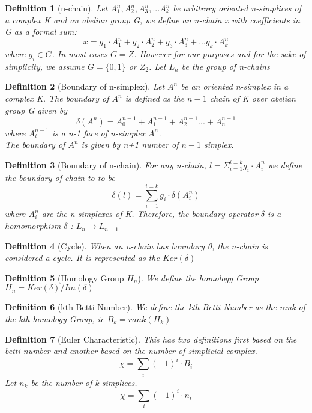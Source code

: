 \documentclass{article}
\newtheorem{definition}{Definition}
\begin{document}
\begin{definition}[n-chain] \label{def:n-chain}
    Let $A_1^n, A_2^n, A_3^n, ... A_k^n$ be arbitrary oriented n-simplices of a complex K and an abelian group G, we define an n-chain x with coefficients in G as a formal sum:
    $$x = g_1 \cdot A_1^n + g_2 \cdot A_2^ n + g_3 \cdot A_3^ n + ... g_k \cdot A_k^ n $$
    where $g_i \in G$.
    In most cases $G = Z$. However for our purposes and for the sake of simplicity, we assume $G = \{0, 1\}$ or $Z_2$. Let $L_n$ be the group of n-chains
\end{definition}

\begin{definition}[Boundary of n-simplex] \label{def:Boundary of n-simplex}
    Let $A^n$ be an oriented n-simplex in a complex K. The boundary of $A^n$ is defined as the $n - 1$ chain of K over abelian group G given by 
    $$\delta(A^n) = A_0^{n-1} + A_1^{n-1} + A_2^{n-1} ... + A_n^{n-1}$$
    where $A_i^{n-1}$ is a n-1 face of n-simplex $A^n$. 
    \\ The boundary of $A^n$ is given by n+1 number of $n - 1$ simplex.
\end{definition}
\begin{definition}[Boundary of n-chain] \label{def:Boundary of n-chain}
    For any n-chain, $l = \Sigma_{i=1}^{i=k} g_i \cdot A_i^{n}$ we define the boundary of chain to to be 
    \begin{equation}
        \delta(l) =   \sum_{i=1}^{i=k} g_i \cdot \delta(A_i^{n})
    \end{equation}
    where $A_i^{n}$ are the n-simplexes of K. Therefore, the boundary operator $\delta$ is a homomorphism $\delta$ : $L_n \xrightarrow{} L_{n-1} $
\end{definition}
\begin{definition}[Cycle] \label{def:Cycle}
    When an n-chain has boundary 0, the n-chain is considered a cycle. It is represented as the $Ker(\delta)$
\end{definition}
\begin{definition}[Homology Group $H_n$] \label{def:Homology Group}
    We define the homology Group $H_n = Ker(\delta) / Im(\delta)$
\end{definition}
\begin{definition}[kth Betti Number] \label{def:kth Betti Number}
    We define the kth Betti Number as the rank of the kth homology Group, ie $B_k = rank(H_k)$
\end{definition}
\begin{definition}[Euler Characteristic] \label{def:Euler Characteristic}
    This has two definitions first based on the betti number and another based on the number of simplicial complex. 
    \begin{equation}
        \chi = \sum_i (-1)^i \cdot B_i
    \end{equation}
    Let $n_k$ be the number of k-simplices.
    \begin{equation}
        \chi = \sum_i (-1)^i \cdot n_i
    \end{equation} 
    
\end{definition}
\end{document}
